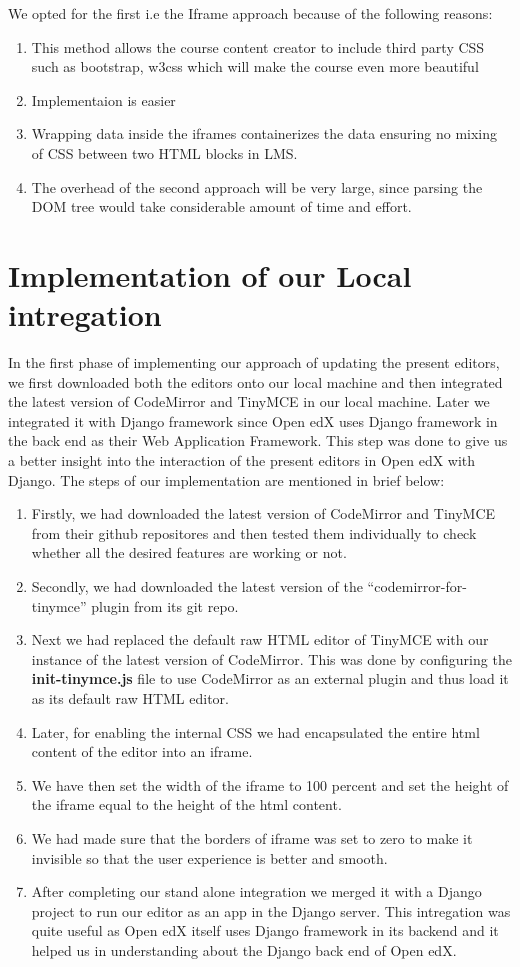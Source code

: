 We opted for the first i.e the Iframe approach because of the following reasons:
\begin{enumerate}
\item This method allows the course content creator to include third party CSS such as
bootstrap, w3css which will make the course even more beautiful
\item Implementaion is easier
\item Wrapping data inside the iframes containerizes the data ensuring no mixing of
CSS between two HTML blocks in LMS.
\item The overhead of the second approach will be very large, since parsing
the DOM tree would take considerable amount of time and effort.
\end{enumerate}


\section{Implementation of our Local intregation}
In the first phase of implementing our approach of updating the present editors, we
first downloaded both the editors onto our local machine and then integrated the latest
version of CodeMirror and TinyMCE in our local machine. Later we integrated it with
Django framework since Open edX uses Django framework in the back end as their Web
Application Framework. This step was done to give us a better insight into the interaction of
the present editors in Open edX with Django. The steps of our implementation are
mentioned in brief below:
\begin{enumerate}
\item Firstly, we had downloaded the latest version of CodeMirror and TinyMCE from their
github repositores and then tested them individually to check whether all the desired features
are working or not.
\item Secondly, we had downloaded the latest version of the “codemirror-for-tinymce” plugin
from its git repo.
\item Next we had replaced the default raw HTML editor of TinyMCE with our instance of the
latest version of CodeMirror. This was done by configuring the \textbf{init-tinymce.js} file to use
CodeMirror as an external plugin and thus load it as its default raw HTML editor.
\item Later, for enabling the internal CSS we had encapsulated the entire html content of the
editor into an iframe.
\item We have then set the width of the iframe to 100 percent and set the height of the iframe
equal to the height of the html content.
\item  We had made sure that the borders of iframe was set to zero to make it invisible so that
the user experience is better and smooth.
\item After completing our stand alone integration we merged it with a Django project to run
our editor as an app in the Django server. This intregation was quite useful as Open edX
itself uses Django framework in its backend and it helped us in understanding about the
Django back end of Open edX.
\end{enumerate}


